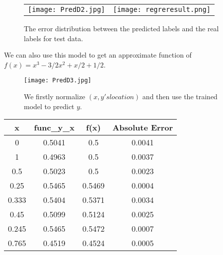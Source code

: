 \documentclass{beamer}
\begin{document}
\begin{frame}
\begin{figure}
  \begin{flushleft}
  \begin{tabular}{p{} p{}}
  \vspace{-5pt}\texttt{[image: PredD2.jpg]}& \vspace{-20pt}\texttt{[image: regreresult.png]}
  \end{tabular}
  \end{flushleft}
  \caption{The error distribution between the predicted labels and the real labels for test data.}
\end{figure}
\end{frame}

\begin{frame}
\begin{flushleft}We can also use this model to get an approximate function of $f(x)=x^3-3/2 x^2+x/2+1/2$.\end{flushleft}
\begin{figure}
  \centering
  \vspace{-15pt}
  \texttt{[image: PredD3.jpg]}\\
  \caption{We firstly normalize $(x,y's location)$ and then use the trained model to predict $y$.}
\end{figure}
\begin{tabular}{|c|c|c|c|}
  \hline
  x & func\_y\_x & f(x) & Absolute Error \\
  \hline
  0 & 0.5041 & 0.5 & 0.0041 \\
  \hline
  1 & 0.4963 & 0.5 & 0.0037 \\
  \hline
  0.5 & 0.5023 & 0.5 & 0.0023 \\
  \hline
  0.25 & 0.5465 & 0.5469 & 0.0004 \\
  \hline
  0.333 & 0.5404 & 0.5371 & 0.0034 \\
  \hline
  0.45& 0.5099 & 0.5124 & 0.0025 \\
  \hline
  0.245 & 0.5465 & 0.5472 & 0.0007 \\
  \hline
  0.765 & 0.4519 & 0.4524 & 0.0005 \\
  \hline
\end{tabular}

\end{frame}
\end{document}
